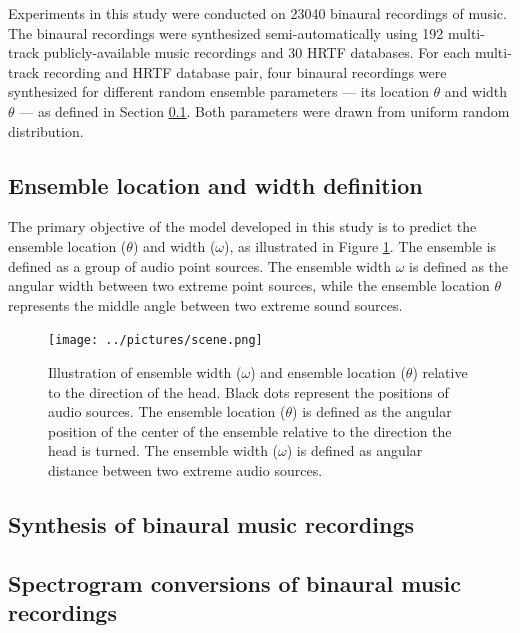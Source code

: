 \documentclass{article}
\begin{document}
Experiments in this study were conducted on 23040 binaural recordings of music. The binaural recordings were synthesized semi-automatically using 192 multi-track publicly-available music recordings and 30 HRTF databases. For each multi-track recording and HRTF database pair, four binaural recordings were synthesized for different random ensemble parameters --- its location $\theta$ and width $\theta$ --- as defined in Section \ref{subsec:ensemble-definition}. Both parameters were drawn from uniform random distribution.

\subsection{Ensemble location and width definition}
\label{subsec:ensemble-definition}

The primary objective of the model developed in this study is to predict the ensemble location ($\theta$) and width ($\omega$), as illustrated in Figure \ref{fig:scene}. The ensemble is defined as a group of audio point sources. The ensemble width $\omega$ is defined as the angular width between two extreme point sources, while the ensemble location $\theta$ represents the middle angle between two extreme sound sources.

\begin{figure}[ht]
  \centering
  \texttt{[image: ../pictures/scene.png]}
  \caption{\label{fig:scene}Illustration of ensemble width ($\omega$) and ensemble location ($\theta$) relative to the direction of the head. Black dots represent the positions of audio sources. The ensemble location ($\theta$) is defined as the angular position of the center of the ensemble relative to the direction the head is turned. The ensemble width ($\omega$) is defined as angular distance between two extreme audio sources. }
\end{figure}

\subsection{Synthesis of binaural music recordings}

\subsection{Spectrogram conversions of binaural music recordings}
\end{document}
